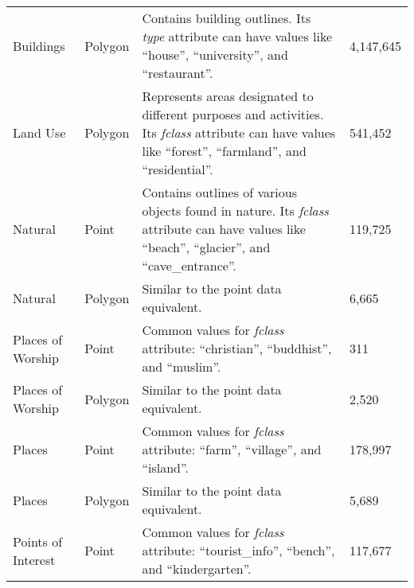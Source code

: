 \begin{longtable}{p{3cm}p{2cm}p{5.7cm}p{2.5cm}}
    Buildings          & Polygon       & Contains building outlines. Its \emph{type} attribute can have values like \enquote{house}, \enquote{university}, and \enquote{restaurant}.                                                  & 4,147,645           \\
    Land Use           & Polygon       & Represents areas designated to different purposes and activities. Its \emph{fclass} attribute can have values like \enquote{forest}, \enquote{farmland}, and \enquote{residential}.          & 541,452             \\
    Natural            & Point         & Contains outlines of various objects found in nature. Its \emph{fclass} attribute can have values like \enquote{beach}, \enquote{glacier}, and \enquote{cave\_entrance}.                     & 119,725             \\
    Natural            & Polygon       & Similar to the point data equivalent.                                                                                                                                                        & 6,665               \\
    Places of Worship  & Point         & Common values for \emph{fclass} attribute: \enquote{christian}, \enquote{buddhist}, and \enquote{muslim}.                                                                                    & 311                 \\
    Places of Worship  & Polygon       & Similar to the point data equivalent.                                                                                                                                                        & 2,520               \\
    Places             & Point         & Common values for \emph{fclass} attribute: \enquote{farm}, \enquote{village}, and \enquote{island}.                                                                                          & 178,997             \\
    Places             & Polygon       & Similar to the point data equivalent.                                                                                                                                                        & 5,689               \\
    Points of Interest & Point         & Common values for \emph{fclass} attribute: \enquote{tourist\_info}, \enquote{bench}, and \enquote{kindergarten}.                                                                             & 117,677             \\

\end{longtable}
